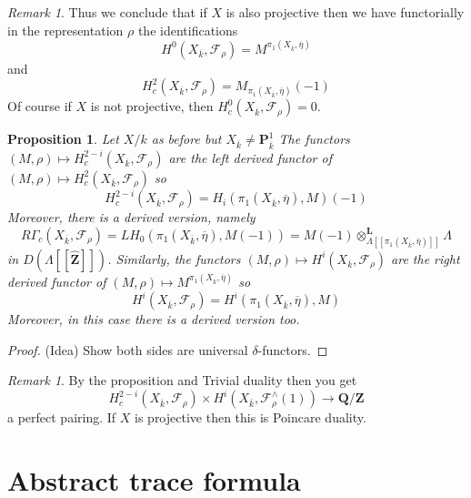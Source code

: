 \documentclass{stacks-project}
\theoremstyle{plain}
\newtheorem{proposition}[subsection]{Proposition}
\theoremstyle{definition}
\theoremstyle{remark}
\newtheorem{remark}[subsection]{Remark}
\numberwithin{equation}{subsection}
\begin{document}
\begin{remark}
\label{remark-projective}
Thus we conclude that if $X$ is also projective then
we have functorially in the representation $\rho$
the identifications
$$
H^0(X_{\overline{k}}, \mathcal{F}_\rho) =
M^{\pi_1(X_{\overline{k}}, \overline\eta)}
$$
and
$$
H_c^2(X_{\overline{k}}, \mathcal{F}_\rho) =
M_{\pi_1(X_{\overline{k}}, \overline \eta)}(-1)
$$
Of course if $X$ is not projective, then
$H^0_c(X_{\overline{k}}, \mathcal{F}_\rho) = 0$.
\end{remark}


\begin{proposition}
\label{proposition-curve-kpi1}
Let $X/k$ as before but $X_{\overline{k}}\neq \mathbf{P}^1_{\overline{k}}$
The functors
$
(M, \rho)\mapsto H_c^{2-i}(X_{\overline{k}}, \mathcal{F}_\rho)
$
are the left derived functor of
$(M, \rho)\mapsto H_c^2(X_{\overline{k}}, \mathcal{F}_\rho)$
so
$$
H_c^{2-i}(X_{\overline{k}}, \mathcal{F}_\rho) =
H_i(\pi_1(X_{\overline{k}}, \overline \eta), M)(-1)
$$
Moreover, there is a derived version, namely
$$
R\Gamma_c(X_{\overline{k}}, \mathcal{F}_\rho)
=
LH_0(\pi_1(X_{\overline{k}}, \overline \eta), M(-1))
=
M(-1)
\otimes_{\Lambda[[\pi_1(X_{\overline{k}}, \overline \eta)]]}^\mathbf{L}
\Lambda
$$
in $D(\Lambda[[\widehat{\mathbf{Z}}]])$.
Similarly, the functors
$(M, \rho)\mapsto H^i(X_{\overline{k}}, \mathcal{F}_\rho)$
are the right derived functor of
$(M, \rho)\mapsto M^{\pi_1(X_{\overline{k}}, \overline \eta)}$
so
$$
H^i(X_{\overline{k}}, \mathcal{F}_\rho) =
H^i(\pi_1(X_{\overline{k}}, \overline \eta), M)
$$
Moreover, in this case there is a derived version too.
\end{proposition}

\begin{proof}
(Idea) Show both sides are universal $\delta$-functors.
\end{proof}

\begin{remark}
\label{remark-poincare-groups}
By the proposition and Trivial duality then you get
$$
H^{2-i}_c(X_{\overline{k}}, \mathcal{F}_\rho)
\times
H^i(X_{\overline{k}}, \mathcal{F}_\rho^\wedge(1))
\to
\mathbf{Q}/\mathbf{Z}
$$
a perfect pairing. If $X$ is projective then this is Poincare duality.
\end{remark}





\section{Abstract trace formula}
\label{section-abstract-trace-formula}
\end{document}
